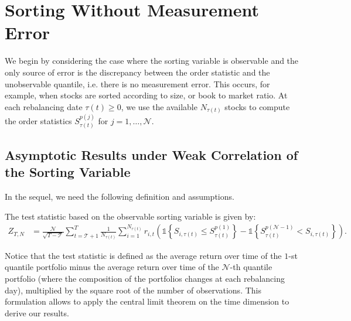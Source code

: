 \section{Sorting Without Measurement Error}
\label{Sorting Without Measurement Error}

We begin by considering the case where the sorting variable is observable and the only source of error is the discrepancy between the order statistic and the unobservable quantile, i.e. there is no measurement error. This occurs, for example, when stocks are sorted according to size, or book to market ratio. At each rebalancing date $\tau(t) \geq 0$, we use the available $N_{\tau(t)}$ stocks to compute the order statistics $S_{\tau(t)}^{p(j)}$ for $j=1,\ldots, \mathcal{N}$. 

\subsection{Asymptotic Results under Weak Correlation of the Sorting Variable}

In the sequel, we need the following definition and assumptions. 

\begin{definition}
\label{def: Zeta}
The test statistic based on the observable sorting variable is given by:
\begin{align*}
    Z_{T,N} &= \frac{\mathcal{N}}{\sqrt{T-\mathcal{T} }} \sum_{t=\mathcal{T} + 1}^{T} \frac{1}{ N_{\tau(t)}} \sum_{i=1}^{N_{\tau(t)}} r_{i,t}\left( \mathds{1} \left\{ S_{i,\tau(t)} \leq S_{\tau(t)}^{p(1)} \right\}  - \mathds{1} \left\{ S_{\tau(t)}^{p(\mathcal{N}-1) } < S_{i,\tau(t)} \right\} \right).
\end{align*}
\end{definition}

\noindent
Notice that the test statistic is defined as the average return over time of the $1$-st quantile portfolio minus the average return over time of the $\mathcal{N}$-th quantile portfolio (where the composition of the portfolios changes at each rebalancing day), multiplied by the square root of the number of observations. This formulation allows to apply the central limit theorem on the time dimension to derive our results.

